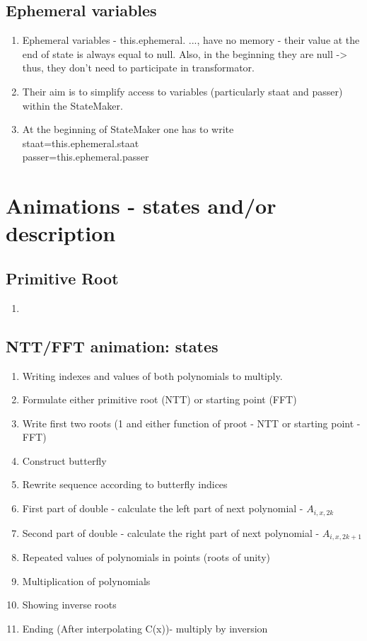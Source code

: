 \documentclass[12pt]{article}
\begin{document}
\subsection {Ephemeral variables}
\begin{enumerate}
	\item Ephemeral variables - this.ephemeral. ..., have no memory - their value at the end of state is always equal to null. Also, in the beginning they are null -> thus, they don't need to participate in transformator.
	\item Their aim is to simplify access to variables (particularly staat and passer) within the StateMaker.
	\item At the beginning of StateMaker one has to write\\
	staat=this.ephemeral.staat\\
	passer=this.ephemeral.passer
\end{enumerate}


\section{Animations - states and/or description}
\subsection{Primitive Root}
\begin{enumerate}
	\item 
\end{enumerate}

\subsection{NTT/FFT animation: states}
\begin {enumerate}
	\item Writing indexes and values of both polynomials to multiply.
	\item Formulate either primitive root (NTT) or starting point (FFT)
	\item Write first two roots (1 and either function of proot - NTT or starting point - FFT)
	\item Construct butterfly
	\item Rewrite sequence according to butterfly indices
	\item First part of double - calculate the left part of next polynomial - \(A_{i,x,2k}\)
	\item Second part of double - calculate the right part of next polynomial - \(A_{i,x,2k+1}\)
	\item Repeated values of polynomials in points (roots of unity)
	\item Multiplication of polynomials
	\item Showing inverse roots
	\item Ending (After interpolating C(x))- multiply by inversion
\end {enumerate}
\end{document}
